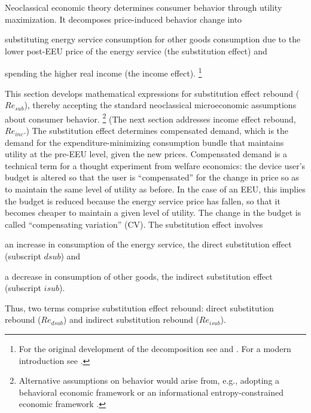 \documentclass[12pt]{article}\usepackage[]{graphicx}\usepackage[]{xcolor}
\begin{document}
Neoclassical economic theory 
determines consumer behavior through utility maximization. 
It decomposes price-induced behavior change into
%
\begin{enumerate*}[label={(\roman*)}]
	
  \item substituting energy service consumption for
        other goods consumption due to the lower post-EEU price of the energy service 
        (the substitution effect) and
  
  \item spending the higher real income (the income effect).%
        \footnote{
          For the original development of the decomposition
          see \citet{Slutsky1915} and \citet{Allen1936}.
          For a modern introduction see \citet{Nicholson2017}.
        }
    
\end{enumerate*}
%
This section develops mathematical expressions 
for substitution effect rebound ($Re_{sub}$),
thereby accepting the standard neoclassical microeconomic assumptions
about consumer behavior.%
\footnote{
  Alternative assumptions on behavior would arise from,
  e.g., adopting a behavioral economic framework
  \citep{Dutschke:2018aa, Dorner:2019aa} or
  an informational entropy-constrained economic framework \citep{Foley:2020aa}.
}
%
(The next section addresses income effect rebound, $Re_{inc}$.)
The substitution effect determines compensated demand,
which is the demand for
the expenditure-minimizing consumption bundle that
maintains utility at the pre-EEU level, given the new prices.
Compensated demand is a technical term for a thought experiment from welfare economics: 
the device user's budget is altered so that the user is ``compensated''
for the change in price so as to maintain the same level of utility as before.
In the case of an EEU, this implies the budget is reduced
because the energy service price has fallen, so that it becomes
cheaper to maintain a given level of utility.
The change in the budget is called ``compensating variation'' (CV).
The substitution effect involves
%
\begin{enumerate*}[label={(\roman*)}]

  \item an increase in consumption of the energy service,
        the direct substitution effect (subscript $dsub$) and

  \item a decrease in consumption of other goods,
        the indirect substitution effect (subscript $isub$).

\end{enumerate*}
%
Thus, two terms comprise substitution effect rebound:
direct substitution rebound ($Re_{dsub}$) and
indirect substitution rebound ($Re_{isub}$).
\end{document}

